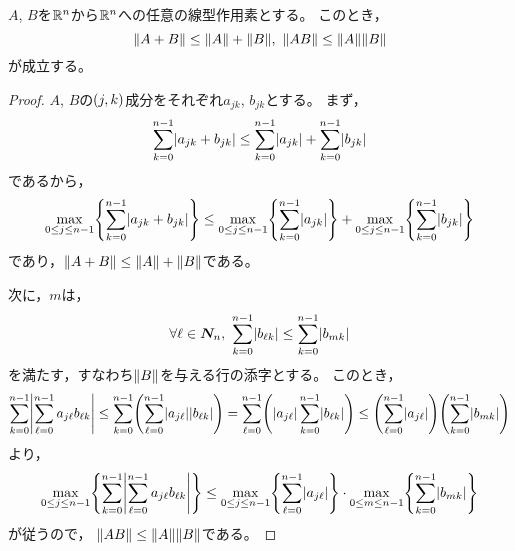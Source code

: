 \documentclass[b5paper,draft,oneside,openany]{ltjsbook} %
\begin{document}
\begin{prop}
    $A$, $B$を$\mathbb{R}^n$から$\mathbb{R}^n$への任意の線型作用素とする。
    このとき，
    \begin{equation}
        \norm{A+B}\leq \norm{A}+\norm{B},\ \norm{AB}\leq \norm{A}\norm{B}
    \end{equation}
    が成立する。
    \begin{proof}
        $A$, $B$の$\pare{j,k}$成分をそれぞれ$a_{jk}$, $b_{jk}$とする。
        まず，
        \begin{equation}
            \sum_{k=0}^{n-1}\abs{a_{jk}+b_{jk}}
            \leq \sum_{k=0}^{n-1}\abs{a_{jk}}
            +\sum_{k=0}^{n-1}\abs{b_{jk}}
        \end{equation}
        であるから，
        \begin{equation}
            \max_{0\leq j\leq n-1}\bra{\sum_{k=0}^{n-1}\abs{a_{jk}+b_{jk}}}
            \leq \max_{0\leq j\leq n-1}\bra{\sum_{k=0}^{n-1}\abs{a_{jk}}}
            +\max_{0\leq j\leq n-1}\bra{\sum_{k=0}^{n-1}\abs{b_{jk}}}
        \end{equation}
        であり，$\norm{A+B}\leq \norm{A}+\norm{B}$である。
        
        次に，$m$は，
        \begin{equation}
            \forall \ell\in \setN,\
            \sum_{k=0}^{n-1}\abs{b_{\ell k}}\leq
            \sum_{k=0}^{n-1}\abs{b_{m k}}
        \end{equation}
        を満たす，すなわち$\norm{B}$を与える行の添字とする。
        このとき，
        \begin{equation}
            \sum_{k=0}^{n-1}\abs{\sum_{\ell=0}^{n-1}a_{j\ell}b_{\ell k}}
            \leq \sum_{k=0}^{n-1}\pare{\sum_{\ell=0}^{n-1}\abs{a_{j\ell}}\abs{b_{\ell k}}}
            =\sum_{\ell=0}^{n-1}\pare{\abs{a_{j\ell}}\sum_{k=0}^{n-1}\abs{b_{\ell k}}}
            \leq \pare{\sum_{\ell=0}^{n-1}\abs{a_{j\ell}}}
            \pare{\sum_{k=0}^{n-1}\abs{b_{mk}}}
        \end{equation}
        より，
        \begin{equation}
            \max_{0\leq j\leq n-1}\bra{\sum_{k=0}^{n-1}\abs{\sum_{\ell=0}^{n-1}a_{j\ell}b_{\ell k}}}
            \leq \max_{0\leq j\leq n-1}\bra{\sum_{\ell=0}^{n-1}\abs{a_{j\ell}}}\cdot \max_{0\leq m\leq n-1}\bra{\sum_{k=0}^{n-1}\abs{b_{mk}}}
        \end{equation}
        が従うので，
        $\norm{AB}\leq \norm{A}\norm{B}$である。
    \end{proof}
\end{prop}
\end{document}
